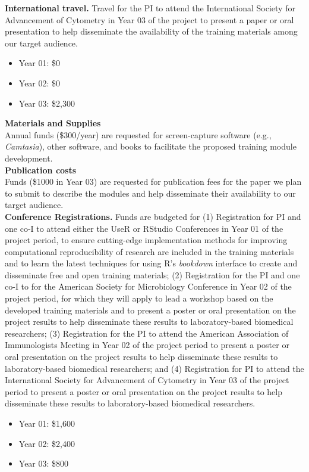 \documentclass[pdftex,english,11pt,parskip=half]{scrartcl}
\begin{document}
\noindent \textbf{International travel.} Travel for the PI to attend the International Society for Advancement of Cytometry in Year 03 of the project to present a paper or oral presentation to help disseminate the availability of the training materials among our target audience. 
\begin{itemize}
\item Year 01: \$0
\item Year 02: \$0
\item Year 03: \$2,300
\end{itemize}

{\large \textbf{Materials and Supplies}} \\ Annual funds (\$300/year) are requested for screen-capture software (e.g., \textit{Camtasia}), other software, and books to facilitate the proposed training module development. \\

{\large \textbf{Publication costs}} \\ Funds (\$1000 in Year 03) are requested for publication fees for the paper we plan to submit to describe the modules and help disseminate their availability to our target audience. \\

\noindent \textbf{Conference Registrations.} Funds are budgeted for (1) Registration for PI and one co-I to attend either the UseR or RStudio Conferences in Year 01 of the project period, to ensure cutting-edge implementation methods for improving computational reproducibility of research are included in the training materials and to learn the latest techniques for using R's \textit{bookdown} interface to create and disseminate free and open training materials; (2) Registration for the PI and one co-I to for the American Society for Microbiology Conference in Year 02 of the project period, for which they will apply to lead a workshop based on the developed training materials and to present a poster or oral presentation on the project results to help disseminate these results to laboratory-based biomedical researchers; (3) Registration for the PI to attend the American Association of Immunologists Meeting in Year 02 of the project period to present a poster or oral presentation on the project results to help disseminate these results to laboratory-based biomedical researchers; and (4) Registration for PI to attend the International Society for Advancement of Cytometry in Year 03 of the project period to present a poster or oral presentation on the project results to help disseminate these results to laboratory-based biomedical researchers.
\begin{itemize}
\item Year 01: \$1,600
\item Year 02: \$2,400
\item Year 03: \$800
\end{itemize}
\end{document}
